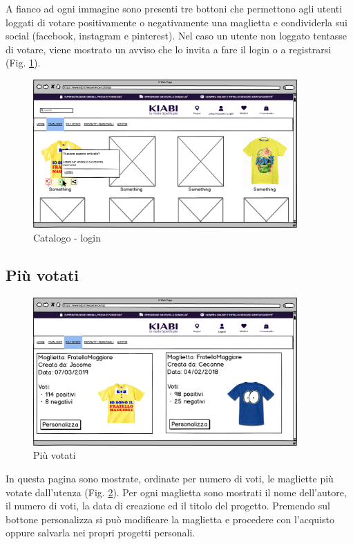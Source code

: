 \documentclass[12pt,italian,]{report}
\begin{document}
A fianco ad ogni immagine sono presenti tre bottoni che permettono agli
utenti loggati di votare positivamente o negativamente una maglietta e condividerla sui social (facebook, instagram e pinterest).
Nel caso un utente non loggato tentasse di votare, viene mostrato un
avviso che lo invita a fare il login o a registrarsi (Fig. \ref{cat-login}).

\begin{figure}[h]
\centering
\includegraphics[width=0.9\textwidth]{../balsamiq/balsamiq_finale/Catalogologin.png}
\caption{Catalogo - login}
\label{cat-login}
\end{figure}

\newpage
\subsection{Più votati}\label{piuxf9-votati}

\begin{figure}[h]
\centering
\includegraphics[width=0.9\textwidth]{../balsamiq/balsamiq_finale/MostRated.png}
\caption{Più votati}
\label{most-rated}
\end{figure}

In questa pagina sono mostrate, ordinate per numero di voti, le
magliette più votate dall'utenza (Fig. \ref{most-rated}). Per ogni maglietta sono mostrati
il nome dell'autore, il numero di voti, la data di creazione ed il titolo del
progetto. Premendo sul bottone personalizza si può modificare la
maglietta e procedere con l'acquisto oppure salvarla nei propri progetti personali.
\end{document}
